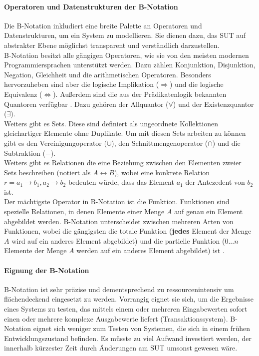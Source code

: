 \paragraph{Operatoren und Datenstrukturen der B-Notation}
Die B-Notation inkludiert eine breite Palette an Operatoren und Datenstrukturen, um ein System zu modellieren. Sie dienen dazu, das \gls{SUT} auf abstrakter Ebene möglichst transparent und verständlich darzustellen.\\
B-Notation besitzt alle gängigen Operatoren, wie sie von den meisten modernen Programmiersprachen unterstützt werden. Dazu zählen Konjunktion, Disjunktion, Negation, Gleichheit und die arithmetischen Operatoren. Besonders hervorzuheben sind aber die logische Implikation ($\Rightarrow$) und die logische Equivalenz ($\Leftrightarrow$). Außerdem sind die aus der Prädikatenlogik bekannten Quantoren verfügbar \cite{teschl_mathematik_2013}. Dazu gehören der Allquantor ($\forall$) und der Existenzquantor ($\exists$).\\
Weiters gibt es Sets. Diese sind definiert als ungeordnete Kollektionen gleichartiger Elemente ohne Duplikate. Um mit diesen Sets arbeiten zu können gibt es den Vereinigungoperator ($\cup$), den Schnittmengenoperator ($\cap$) und die Subtraktion ($-$).\\
Weiters gibt es Relationen die eine Beziehung zwischen den Elementen zweier Sets beschreiben (notiert als $A \leftrightarrow B$), wobei eine konkrete Relation $r = {a_1 \rightarrow b_1, a_2 \rightarrow b_2} $ bedeuten würde, dass das Element $a_1$ der Antezedent von $b_2$ ist.\\
Der mächtigste Operator in B-Notation ist die Funktion. Funktionen sind spezielle Relationen, in denen Elemente einer Menge $A$ auf genau ein Element abgebildet werden. B-Notation unterscheidet zwischen mehreren Arten von Funktionen, wobei die gängigsten die totale Funktion (\textbf{jedes} Element der Menge $A$ wird auf ein anderes Element abgebildet) und die partielle Funktion ($0...n$ Elemente der Menge $A$ werden auf ein anderes Element abgebildet) ist \cite{utting_practical_2007}. 

\paragraph{Eignung der B-Notation}
B-Notation ist sehr präzise und dementsprechend zu ressourcenintensiv um flächendeckend eingesetzt zu werden. Vorrangig eignet sie sich, um die Ergebnisse eines Systems zu testen, das mittels einem oder mehreren Eingabewerten sofort einen oder mehrere komplexe Ausgabewerte liefert (Transaktionssystem). B-Notation eignet sich weniger zum Testen von Systemen, die sich in einem frühen Entwicklungszustand befinden. Es müsste zu viel Aufwand investiert werden, der innerhalb kürzester Zeit durch Änderungen am \Gls{SUT} umsonst gewesen wäre.

